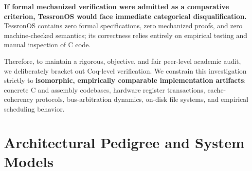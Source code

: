 \documentclass[10pt,journal,compsoc,twocolumn]{article}
\begin{document}
\textbf{If formal mechanized verification were admitted as a comparative criterion, TessronOS would face immediate categorical disqualification.} TessronOS contains zero formal specifications, zero mechanized proofs, and zero machine-checked semantics; its correctness relies entirely on empirical testing and manual inspection of C code. 

Therefore, to maintain a rigorous, objective, and fair peer-level academic audit, we deliberately bracket out Coq-level verification. We constrain this investigation strictly to \textbf{isomorphic, empirically comparable implementation artifacts}: concrete C and assembly codebases, hardware register transactions, cache-coherency protocols, bus-arbitration dynamics, on-disk file systems, and empirical scheduling behavior.

\section{Architectural Pedigree and System Models}
\label{sec:pedigree}
\end{document}
